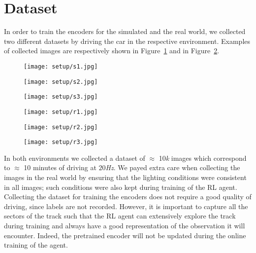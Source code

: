 \section{Dataset}
In order to train the encoders for the simulated and the real world, we collected two different datasets by driving the car in the respective environment. Examples of collected images are respectively shown in Figure~\ref{fig:datasetsim} and in Figure~\ref{fig:datasetreal}.

\begin{figure}[h]
	\begin{minipage}{.33\textwidth}
		\centering
		\texttt{[image: setup/s1.jpg]}
	\end{minipage}%
	\begin{minipage}{.33\textwidth}
		\centering
		\texttt{[image: setup/s2.jpg]}
	\end{minipage}%
	\begin{minipage}{.33\textwidth}
		\centering
		\texttt{[image: setup/s3.jpg]}
	\end{minipage}
	\label{fig:datasetsim}
\end{figure}

\begin{figure}[h]
	\begin{minipage}{.33\textwidth}
		\centering
		\texttt{[image: setup/r1.jpg]}
	\end{minipage}%
	\begin{minipage}{.33\textwidth}
		\centering
		\texttt{[image: setup/r2.jpg]}
	\end{minipage}%
	\begin{minipage}{.33\textwidth}
		\centering
		\texttt{[image: setup/r3.jpg]}
	\end{minipage}
	\label{fig:datasetreal}
\end{figure}

In both environments we collected a dataset of $\approx$ 10\textit{k} images which correspond to $\approx$ 10 minutes of driving at $20$\textit{Hz}. We payed extra care when collecting the images in the real world by ensuring that the lighting conditions were consistent in all images; such conditions were also kept during training of the RL agent. Collecting the dataset for training the encoders does not require a good quality of driving, since labels are not recorded. However, it is important to capture all the sectors of the track such that the RL agent can extensively explore the track during training and always have a good representation of the observation it will encounter. Indeed, the pretrained encoder will not be updated during the online training of the agent.


